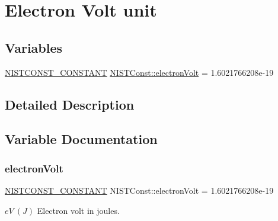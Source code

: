 \hypertarget{group___n_i_s_t_const-_electron_volt_unit}{}\section{Electron Volt unit}
\label{group___n_i_s_t_const-_electron_volt_unit}
\subsection*{Variables}
\begin{DoxyCompactItemize}
\item 
\mbox{\hyperlink{group___n_i_s_t_const-_macros_ga2b0fc1d7452373f816175dd86ce26729}{N\+I\+S\+T\+C\+O\+N\+S\+T\+\_\+\+C\+O\+N\+S\+T\+A\+NT}} \mbox{\hyperlink{group___n_i_s_t_const-_electron_volt_unit_ga83756881e375cccc1827b15bd46bdae4}{N\+I\+S\+T\+Const\+::electron\+Volt}} = 1.\+6021766208e-\/19
\end{DoxyCompactItemize}


\subsection{Detailed Description}


\subsection{Variable Documentation}
\mbox{\label{group___n_i_s_t_const-_electron_volt_unit_ga83756881e375cccc1827b15bd46bdae4}} 
\subsubsection{\texorpdfstring{electron\+Volt}{electronVolt}}
{\footnotesize\ttfamily \mbox{\hyperlink{group___n_i_s_t_const-_macros_ga2b0fc1d7452373f816175dd86ce26729}{N\+I\+S\+T\+C\+O\+N\+S\+T\+\_\+\+C\+O\+N\+S\+T\+A\+NT}} N\+I\+S\+T\+Const\+::electron\+Volt = 1.\+6021766208e-\/19}

$eV \ (J)$ Electron volt in joules. 